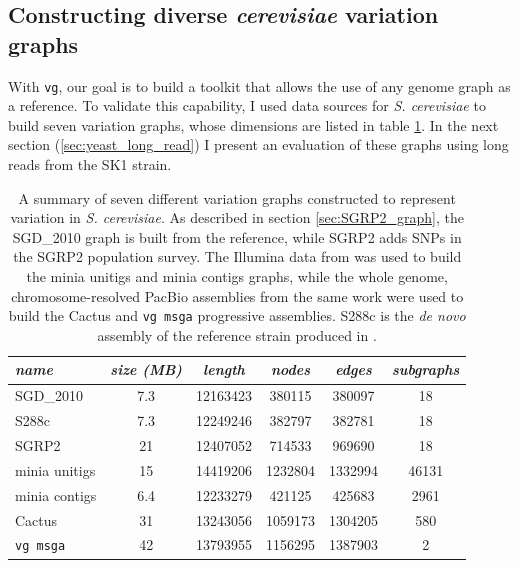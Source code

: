 \subsection{Constructing diverse \emph{cerevisiae} variation graphs}
\label{sec:constructing_yeast_graphs}

With {\tt vg}, our goal is to build a toolkit that allows the use of any genome graph as a reference.
To validate this capability, I used data sources for \emph{S. cerevisiae} to build seven variation graphs, whose dimensions are listed in table \ref{table:yeast_graphs}.
In the next section (\ref{sec:yeast_long_read}) I present an evaluation of these graphs using long reads from the SK1 strain.


\begin{table}[h]
  \centering
\begin{tabular}{l||c|c|c|c|c}
\itshape name & \itshape size (MB) & \itshape length & \itshape nodes & \itshape edges & \itshape subgraphs \\
\hline
SGD\_2010 & 7.3 & 12163423 & 380115 & 380097 & 18 \\
S288c & 7.3 & 12249246 & 382797 & 382781 & 18 \\
SGRP2 & 21 & 12407052 & 714533 & 969690 & 18 \\
minia unitigs & 15 & 14419206 & 1232804 & 1332994 & 46131 \\
minia contigs & 6.4 & 12233279 & 421125 & 425683 & 2961 \\
Cactus & 31 & 13243056 & 1059173 & 1304205 & 580 \\
{\tt vg msga} & 42 & 13793955 & 1156295 & 1387903 & 2 \\
\hline
\end{tabular}
\caption[\emph{S. cerevisiae} variation graphs]{
  A summary of seven different variation graphs constructed to represent variation in \emph{S. cerevisiae}.
  As described in section \ref{sec:SGRP2_graph}, the SGD\_2010 graph is built from the reference, while SGRP2 adds SNPs in the SGRP2 population survey.
  The Illumina data from \cite{yue2017contrasting} was used to build the minia unitigs and minia contigs graphs, while the whole genome, chromosome-resolved PacBio assemblies from the same work were used to build the Cactus and {\tt vg msga} progressive assemblies.
  S288c is the \emph{de novo} assembly of the reference strain produced in \cite{yue2017contrasting}.
}
\label{table:yeast_graphs}
\end{table}

